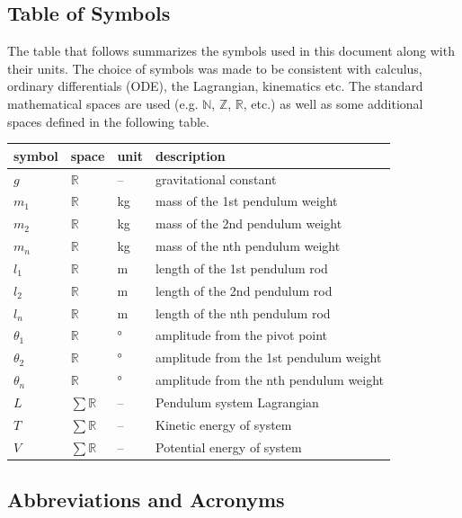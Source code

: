 \documentclass[12pt]{article}
\begin{document}
\subsection{Table of Symbols}

The table that follows summarizes the symbols used in this document along with
their units. The choice of symbols was made to be consistent with calculus, 
ordinary differentials (ODE), the Lagrangian, kinematics etc. The standard 
mathematical spaces are used (e.g. $\mathbb{N}$, $\mathbb{Z}$, $\mathbb{R}$, 
etc.) as well as some additional spaces defined in the following table. 
~\newline
\renewcommand{\arraystretch}{1.2}
\noindent \begin{longtable*}{l l l p{8cm}} \toprule
\textbf{symbol} & \textbf{space} & \textbf{unit} & \textbf{description}\\
\midrule 
$g$ & $\mathbb{R}$ & -- & gravitational constant
\\
$m_1$ & $\mathbb{R}$ & kg & mass of the 1st pendulum weight
\\ 
$m_2$ & $\mathbb{R}$ & kg & mass of the 2nd pendulum weight
\\ 
$m_n$ & $\mathbb{R}$ & kg & mass of the nth pendulum weight
\\ 
$l_1$ & $\mathbb{R}$ & m & length of the 1st pendulum rod
\\ 
$l_2$ & $\mathbb{R}$ & m & length of the 2nd pendulum rod
\\ 
$l_n$ & $\mathbb{R}$ & m & length of the nth pendulum rod
\\
$\theta_1$ & $\mathbb{R}$ & \si{\degree} & amplitude from 
the pivot point
\\
$\theta_2$ & $\mathbb{R}$ & \si{\degree} & amplitude from 
the 1st pendulum weight
\\
$\theta_n$ & $\mathbb{R}$ & \si{\degree} & amplitude from 
the nth pendulum weight
\\
$L$ & $\sum\mathbb{R}$ & -- & Pendulum system Lagrangian
\\
$T$ & $\sum\mathbb{R}$ & -- & Kinetic energy of system
\\
$V$ & $\sum\mathbb{R}$ & -- & Potential energy of system
\\
\bottomrule
\end{longtable*}
\newpage
\subsection{Abbreviations and Acronyms}
\end{document}
